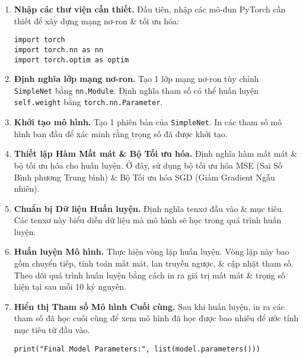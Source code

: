 \documentclass{article}
\begin{document}
\begin{enumerate}
    \item {\bf Nhập các thư viện cần thiết.} Đầu tiên, nhập các mô-đun PyTorch cần thiết để xây dựng mạng nơ-ron \& tối ưu hóa:
    \begin{verbatim}
import torch
import torch.nn as nn
import torch.optim as optim
    \end{verbatim}
    \item {\bf Định nghĩa lớp mạng nơ-ron.} Tạo 1 lớp mạng nơ-ron tùy chỉnh {\tt SimpleNet} bằng {\tt nn.Module}. Định nghĩa tham số có thể huấn luyện {\tt self.weight} bằng {\tt torch.nn.Parameter}.
    \item {\bf Khởi tạo mô hình.} Tạo 1 phiên bản của {\tt SimpleNet}. In các tham số mô hình ban đầu để xác minh rằng trọng số đã được khởi tạo.

    \item {\bf Thiết lập Hàm Mất mát \& Bộ Tối ưu hóa.} Định nghĩa hàm mất mát \& bộ tối ưu hóa cho huấn luyện. Ở đây, sử dụng bộ tối ưu hóa MSE (Sai Số Bình phương Trung bình) \& Bộ Tối ưu hóa SGD (Giảm Gradient Ngẫu nhiên).
    \item {\bf Chuẩn bị Dữ liệu Huấn luyện.} Định nghĩa tenxơ đầu vào \& mục tiêu. Các tenxơ này biểu diễn dữ liệu mà mô hình sẽ học trong quá trình huấn luyện.
    \item {\bf Huấn luyện Mô hình.} Thực hiện vòng lặp huấn luyện. Vòng lặp này bao gồm chuyển tiếp, tính toán mất mát, lan truyền ngược, \& cập nhật tham số. Theo dõi quá trình huấn luyện bằng cách in ra giá trị mất mát \& trọng số hiện tại sau mỗi 10 kỷ nguyên.
    \item {\bf Hiển thị Tham số Mô hình Cuối cùng.} Sau khi huấn luyện, in ra các tham số đã học cuối cùng để xem mô hình đã học được bao nhiêu để ước tính mục tiêu từ đầu vào.
    \begin{verbatim}
print("Final Model Parameters:", list(model.parameters()))
    \end{verbatim}
\end{enumerate}

\end{document}

